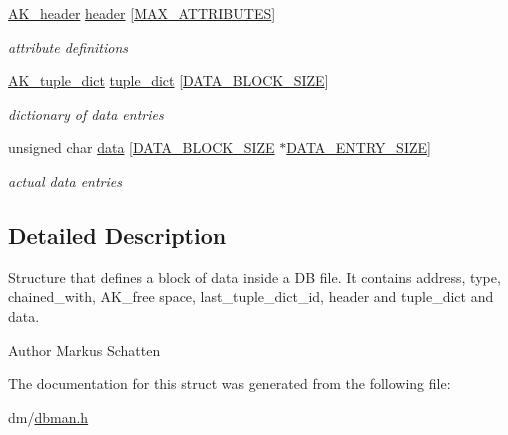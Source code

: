 \begin{DoxyCompactItemize}
\hyperlink{structAK__header}{A\+K\+\_\+header} \hyperlink{structAK__block_a291a49ea3dc9d972d3e1da46ba620903}{header} \mbox{[}\hyperlink{constants_8h_a4d992a1f9192388588184753115f6c03}{M\+A\+X\+\_\+\+A\+T\+T\+R\+I\+B\+U\+T\+ES}\mbox{]}
\begin{DoxyCompactList}\small\item\em attribute definitions \end{DoxyCompactList}\item 
\mbox{\label{structAK__block_ad5eaa0ebdbeee5d5083d185c8b9ac3b4}} 
\hyperlink{structAK__tuple__dict}{A\+K\+\_\+tuple\+\_\+dict} \hyperlink{structAK__block_ad5eaa0ebdbeee5d5083d185c8b9ac3b4}{tuple\+\_\+dict} \mbox{[}\hyperlink{constants_8h_a0a453aabbfa4d2725b52e248a39e7b89}{D\+A\+T\+A\+\_\+\+B\+L\+O\+C\+K\+\_\+\+S\+I\+ZE}\mbox{]}
\begin{DoxyCompactList}\small\item\em dictionary of data entries \end{DoxyCompactList}\item 
\mbox{\label{structAK__block_af66ba2bcc5d90ff18f09982975efb913}} 
unsigned char \hyperlink{structAK__block_af66ba2bcc5d90ff18f09982975efb913}{data} \mbox{[}\hyperlink{constants_8h_a0a453aabbfa4d2725b52e248a39e7b89}{D\+A\+T\+A\+\_\+\+B\+L\+O\+C\+K\+\_\+\+S\+I\+ZE} $\ast$\hyperlink{constants_8h_a115ddfa0054fd03c6dc197f0abe5e0b0}{D\+A\+T\+A\+\_\+\+E\+N\+T\+R\+Y\+\_\+\+S\+I\+ZE}\mbox{]}
\begin{DoxyCompactList}\small\item\em actual data entries \end{DoxyCompactList}\end{DoxyCompactItemize}


\subsection{Detailed Description}
Structure that defines a block of data inside a DB file. It contains address, type, chained\+\_\+with, A\+K\+\_\+free space, last\+\_\+tuple\+\_\+dict\+\_\+id, header and tuple\+\_\+dict and data. 

\begin{DoxyAuthor}{Author}
Markus Schatten 
\end{DoxyAuthor}


The documentation for this struct was generated from the following file\+:\begin{DoxyCompactItemize}
\item 
dm/\hyperlink{dbman_8h}{dbman.\+h}\end{DoxyCompactItemize}
